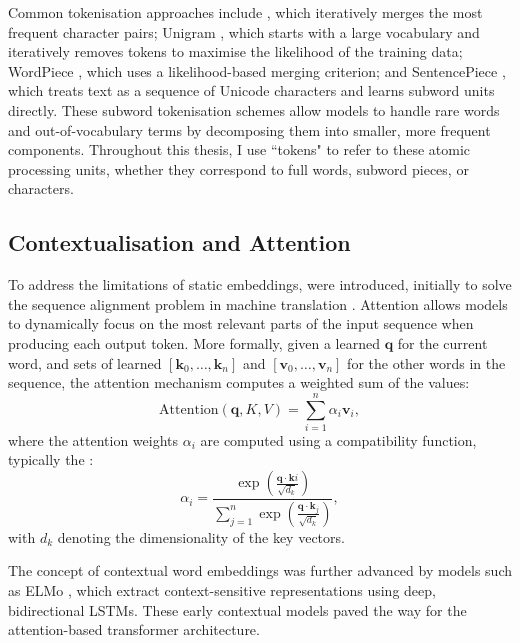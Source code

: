 Common tokenisation approaches include  \citep{gage1994bpe, sennrich2016bpe}, which iteratively merges the most frequent character pairs; Unigram \citep{kudo2018unigram}, which starts with a large vocabulary and iteratively removes tokens to maximise the likelihood of the training data; WordPiece \citep{wu2016google}, which uses a likelihood-based merging criterion; and SentencePiece \citep{kudo2018sentencepiece}, which treats text as a sequence of Unicode characters and learns subword units directly. These subword tokenisation schemes allow models to handle rare words and out-of-vocabulary terms by decomposing them into smaller, more frequent components. Throughout this thesis, I use ``tokens" to refer to these atomic processing units, whether they correspond to full words, subword pieces, or characters.

\subsection{Contextualisation and Attention}
To address the limitations of static embeddings,  were introduced, initially to solve the sequence alignment problem in machine translation \citep{bahdanau2015neural,luong2015effective}. Attention allows models to dynamically focus on the most relevant parts of the input sequence when producing each output token. More formally, given a learned  $\mathbf{q}$ for the current word, and sets of learned  $[\mathbf{k}_0, \ldots, \mathbf{k}_n]$ and  $[\mathbf{v}_0, \ldots, \mathbf{v}_n]$ for the other words in the sequence, the attention mechanism computes a weighted sum of the values:
\begin{equation}
\text{Attention}(\mathbf{q}, K, V) = \sum_{i=1}^{n} \alpha_i \mathbf{v}_i,
\end{equation}
where the attention weights $\alpha_i$ are computed using a compatibility function, typically the :
\begin{equation}
\alpha_i = \frac{\exp\left(\frac{\mathbf{q} \cdot \mathbf{k}i}{\sqrt{d_k}}\right)}{\sum_{j=1}^{n} \exp\left(\frac{\mathbf{q} \cdot \mathbf{k}_j}{\sqrt{d_k}}\right)},
\end{equation}
with $d_k$ denoting the dimensionality of the key vectors. 

The concept of contextual word embeddings was further advanced by models such as ELMo \citep{peters2018deep}, which extract context-sensitive representations using deep, bidirectional LSTMs. These early contextual models paved the way for the attention-based transformer architecture.

